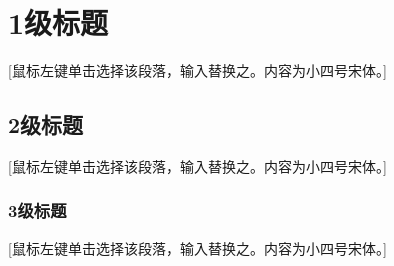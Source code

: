 \chapter{1级标题}
\label{chapter4}

[鼠标左键单击选择该段落，输入替换之。内容为小四号宋体。]

\section{2级标题}
 [鼠标左键单击选择该段落，输入替换之。内容为小四号宋体。]

\subsection{3级标题}
[鼠标左键单击选择该段落，输入替换之。内容为小四号宋体。]